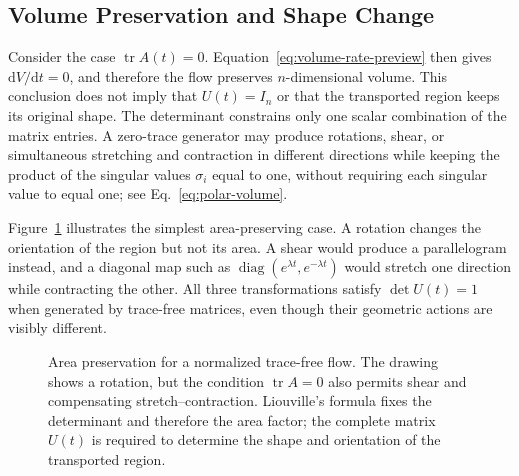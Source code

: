 \documentclass[11pt,a4paper]{article}
\newcommand{\dd}{\mathrm{d}}
\DeclareMathOperator{\tr}{tr}
\theoremstyle{definition}
\numberwithin{equation}{section}
\begin{document}
\subsection{Volume Preservation and Shape Change}

Consider the case $\tr A(t)=0$. Equation~\eqref{eq:volume-rate-preview} then gives $\dd V/\dd t=0$, and therefore the flow preserves $n$-dimensional volume. This conclusion does not imply that $U(t)=I_n$ or that the transported region keeps its original shape. The determinant constrains only one scalar combination of the matrix entries. A zero-trace generator may produce rotations, shear, or simultaneous stretching and contraction in different directions while keeping the product of the singular values $\sigma_i$ equal to one, without requiring each singular value to equal one; see Eq.~\eqref{eq:polar-volume}.

Figure~\ref{fig:zero-trace} illustrates the simplest area-preserving case. A rotation changes the orientation of the region but not its area. A shear would produce a parallelogram instead, and a diagonal map such as $\operatorname{diag}(e^{\lambda t},e^{-\lambda t})$ would stretch one direction while contracting the other. All three transformations satisfy $\det U(t)=1$ when generated by trace-free matrices, even though their geometric actions are visibly different.

\begin{figure}[ht]
\centering
{}
\caption{Area preservation for a normalized trace-free flow. The drawing shows a rotation, but the condition $\tr A=0$ also permits shear and compensating stretch--contraction. Liouville's formula fixes the determinant and therefore the area factor; the complete matrix $U(t)$ is required to determine the shape and orientation of the transported region.}
\label{fig:zero-trace}
\end{figure}
\end{document}
